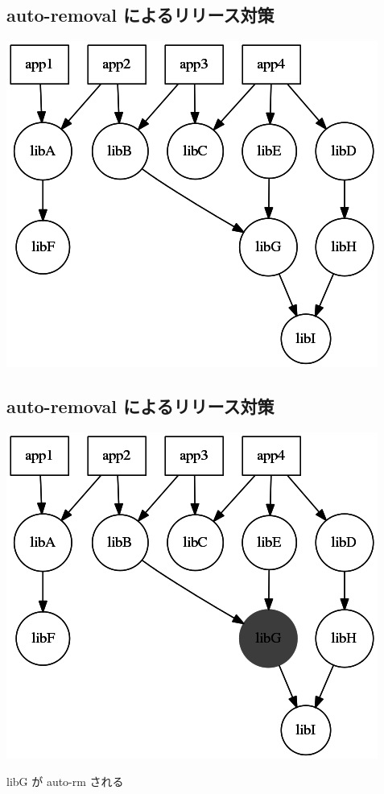 \documentclass[mingoth,a4paper]{jsarticle}
\begin{document}
\subsection{auto-removal によるリリース対策}
\begin{center}
\includegraphics[scale=0.4]{image201410/auto-rm_mono.png}
\end{center}


\subsection{auto-removal によるリリース対策}
\begin{center}
\includegraphics[scale=0.4]{image201410/auto-rm2_mono.png}

libG が auto-rm される
\end{center}
\end{document}
